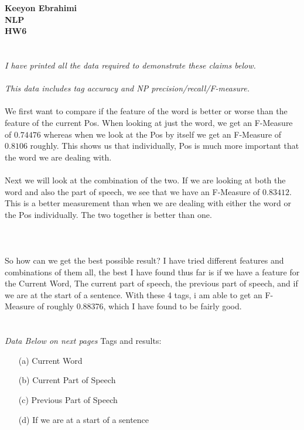 \documentclass[ruled]{article}
\begin{document}
\textbf{Keeyon Ebrahimi}\\
\textbf{NLP}\\
\textbf{HW6}\\ \\ \\


\large{\textit{I have printed all the data required to demonstrate these claims below.}} \\\\   
\large{\textit{This data includes tag accuracy and NP precision/recall/F-measure.}} \\\\   
We first want to compare if the feature of the word is better or worse than the feature of the current Pos.  When looking at just the word, we get an F-Measure of $0.74476$ whereas when we look at the Pos by itself we get an F-Measure of $0.8106$ roughly.  This shows us that individually, Pos is much more important that the word we are dealing with.
\\ \\
Next we will look at the combination of the two.  If we are looking at both the word and also the part of speech, we see that we have an F-Measure of $0.83412$.  This is a better measurement than when we are dealing with either the word or the Pos individually.  The two together is better than one.  \\ \\
\\ \\
So how can we get the best possible result?  I have tried different features and combinations of them all, the best I have found thus far is if we have a feature for the Current Word, The current part of speech, the previous part of speech, and if we are at the start of a sentence. With these 4 tags, i am able to get an F-Measure of roughly 0.88376, which I have found to be fairly good.  
\\ \\ \\
\large{\textit{Data Below on next pages}}
\newpage
Tags and results:
\begin{itemize}
\item[(a)] Current Word
\item[(b)] Current Part of Speech
\item[(c)] Previous Part of Speech
\item[(d)] If we are at a start of a sentence
\end{itemize}
\end{document}
